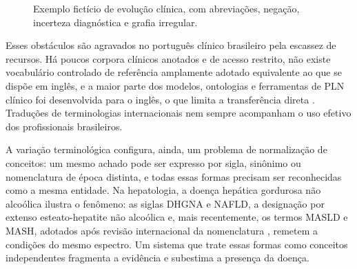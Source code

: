 \begin{figure}[!htbp]
\centering
\newcommand{\mAbr}[1]{{\setlength{\fboxsep}{0.8pt}\colorbox{vAzul!22}{\strut #1}}}
\newcommand{\mNeg}[1]{{\setlength{\fboxsep}{0.8pt}\colorbox{vVermelho!22}{\strut #1}}}
\newcommand{\mInc}[1]{{\setlength{\fboxsep}{0.8pt}\colorbox{vAmbar!35}{\strut #1}}}
\newcommand{\mGra}[1]{{\setlength{\fboxsep}{0.8pt}\colorbox{vRoxo!20}{\strut #1}}}
\caption[Exemplo fictício de evolução clínica]{Exemplo fictício de evolução clínica, com abreviações, negação, incerteza diagnóstica e grafia irregular.}
\label{fig:nota-clinica}
\par{}
\end{figure}

Esses obstáculos são agravados no português clínico brasileiro pela escassez de recursos. Há poucos corpora clínicos anotados e de acesso restrito, não existe vocabulário controlado de referência amplamente adotado equivalente ao que se dispõe em inglês, e a maior parte dos modelos, ontologias e ferramentas de PLN clínico foi desenvolvida para o inglês, o que limita a transferência direta \citep{stammers2025,omar2025}. Traduções de terminologias internacionais nem sempre acompanham o uso efetivo dos profissionais brasileiros.

A variação terminológica configura, ainda, um problema de normalização de conceitos: um mesmo achado pode ser expresso por sigla, sinônimo ou nomenclatura de época distinta, e todas essas formas precisam ser reconhecidas como a mesma entidade. Na hepatologia, a doença hepática gordurosa não alcoólica ilustra o fenômeno: as siglas DHGNA e NAFLD, a designação por extenso esteato-hepatite não alcoólica e, mais recentemente, os termos MASLD e MASH, adotados após revisão internacional da nomenclatura \citep{rinella2023}, remetem a condições do mesmo espectro. Um sistema que trate essas formas como conceitos independentes fragmenta a evidência e subestima a presença da doença.

